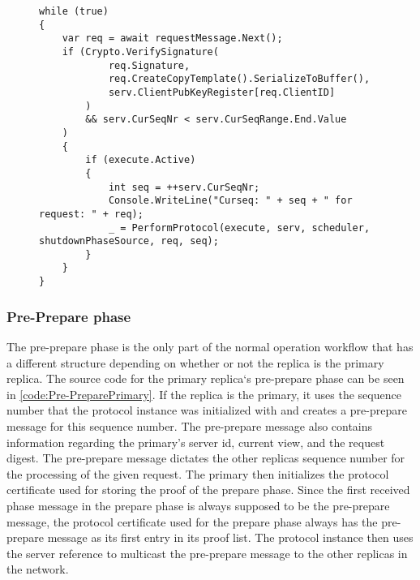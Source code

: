 \begin{figure}[H]
	\centering
	\begin{lstlisting}[label = code:StartProtocol, caption=Code section from the request handler, captionpos = b, basicstyle=\scriptsize]
while (true)
{
    var req = await requestMessage.Next();
    if (Crypto.VerifySignature(
            req.Signature, 
            req.CreateCopyTemplate().SerializeToBuffer(), 
            serv.ClientPubKeyRegister[req.ClientID]
        ) 
        && serv.CurSeqNr < serv.CurSeqRange.End.Value
    )
    {
        if (execute.Active)
        {
            int seq = ++serv.CurSeqNr;
            Console.WriteLine("Curseq: " + seq + " for request: " + req);
            _ = PerformProtocol(execute, serv, scheduler, shutdownPhaseSource, req, seq);
        }
    }
}
	\end{lstlisting}
\end{figure}

\subsubsection{Pre-Prepare phase}
\label{sec:prepare}
The pre-prepare phase is the only part of the normal operation workflow that has a different structure depending on whether or not the replica is the primary replica. The source code for the primary replica`s pre-prepare phase can be seen in \autoref{code:Pre-PreparePrimary}. If the replica is the primary, it uses the sequence number that the protocol instance was initialized with and creates a pre-prepare message for this sequence number. The pre-prepare message also contains information regarding the primary’s server id, current view, and the request digest. The pre-prepare message dictates the other replicas sequence number for the processing of the given request. The primary then initializes the protocol certificate used for storing the proof of the prepare phase. Since the first received phase message in the prepare phase is always supposed to be the pre-prepare message, the protocol certificate used for the prepare phase always has the pre-prepare message as its first entry in its proof list. The protocol instance then uses the server reference to multicast the pre-prepare message to the other replicas in the network. 

